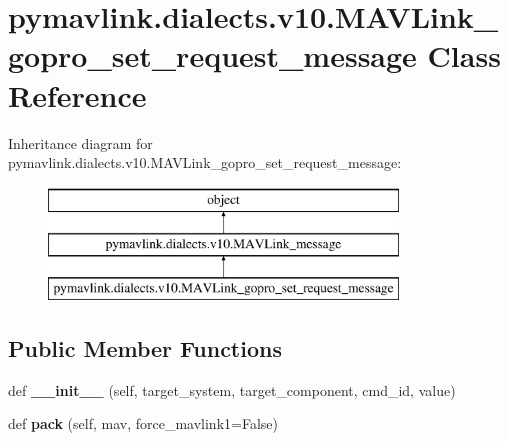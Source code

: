 \hypertarget{classpymavlink_1_1dialects_1_1v10_1_1MAVLink__gopro__set__request__message}{}\section{pymavlink.\+dialects.\+v10.\+M\+A\+V\+Link\+\_\+gopro\+\_\+set\+\_\+request\+\_\+message Class Reference}
\label{classpymavlink_1_1dialects_1_1v10_1_1MAVLink__gopro__set__request__message}
Inheritance diagram for pymavlink.\+dialects.\+v10.\+M\+A\+V\+Link\+\_\+gopro\+\_\+set\+\_\+request\+\_\+message\+:\begin{figure}[H]
\begin{center}
\leavevmode
\includegraphics[height=3.000000cm]{classpymavlink_1_1dialects_1_1v10_1_1MAVLink__gopro__set__request__message}
\end{center}
\end{figure}
\subsection*{Public Member Functions}
\begin{DoxyCompactItemize}
\item 
\mbox{\label{classpymavlink_1_1dialects_1_1v10_1_1MAVLink__gopro__set__request__message_a3900b6be9fd1f8cc314eccce917da296}} 
def {\bfseries \+\_\+\+\_\+init\+\_\+\+\_\+} (self, target\+\_\+system, target\+\_\+component, cmd\+\_\+id, value)
\item 
\mbox{\label{classpymavlink_1_1dialects_1_1v10_1_1MAVLink__gopro__set__request__message_acb434dc1d70852559e59243e668caabf}} 
def {\bfseries pack} (self, mav, force\+\_\+mavlink1=False)
\end{DoxyCompactItemize}

